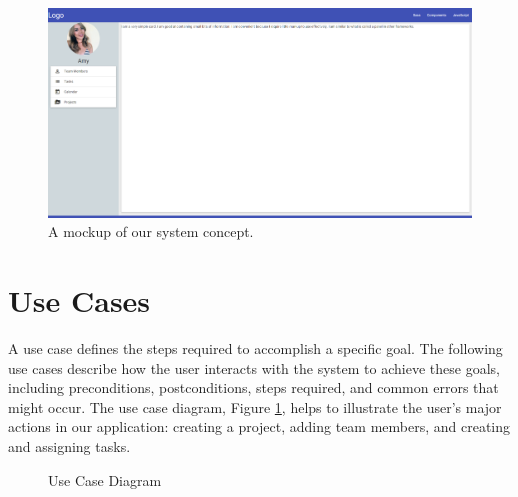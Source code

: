 \begin{figure}[ht]
\includegraphics[width=\textwidth]{mockup.png}
\caption{A mockup of our system concept.}
\end{figure}
\FloatBarrier

\section{Use Cases}
A use case defines the steps required to accomplish a specific goal. The following use cases describe how the user interacts with the system to achieve these goals, including preconditions, postconditions, steps required, and common errors that might occur. The use case diagram, Figure \ref{ucd}, helps to illustrate the user’s major actions in our application: creating a project, adding team members, and creating and assigning tasks. 
\begin{figure}[ht]
\centering
{}
\caption{Use Case Diagram}
\label{ucd}
\end{figure}

